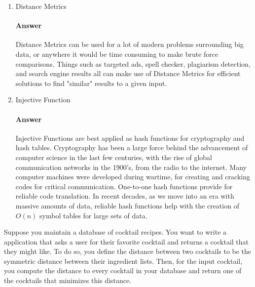 \documentclass{article}
\begin{document}
\begin{enumerate}
    \item Distance Metrics

        \paragraph{Answer}

    
        Distance Metrics can be used for a lot of modern problems surrounding big data, or anywhere it would be time consuming to make brute force comparisons. Things such as targeted ads, spell checker, plagiarism detection, and search engine results all can make use of Distance Metrics for efficient solutions to find "similar" results to a given input.

    \item Injective Function

        \paragraph{Answer}

        Injective Functions are best applied as hash functions for cryptography and hash tables. Cryptography has been a large force behind the advancement of computer science in the last few centuries, with the rise of global communication networks in the 1900's, from the radio to the internet. Many computer machines were developed during wartime, for creating and cracking codes for critical communication. One-to-one hash functions provide for reliable code translation. In recent decades, as we move into an era with massive amounts of data, reliable hash functions help with the creation of $O(n)$ symbol tables for large sets of data.


\end{enumerate}


\collab{} 

Suppose you maintain a database of cocktail recipes.  You want to write a
application that asks a user for their favorite cocktail and returns a cocktail
that they might like.  To do so, you define the distance between two cocktails
to be the symmetric distance between their ingredient lists.  Then, for the
input cocktail, you compute the distance to every cocktail in your database and
return one of the cocktails that minimizes this distance.
\end{document}
